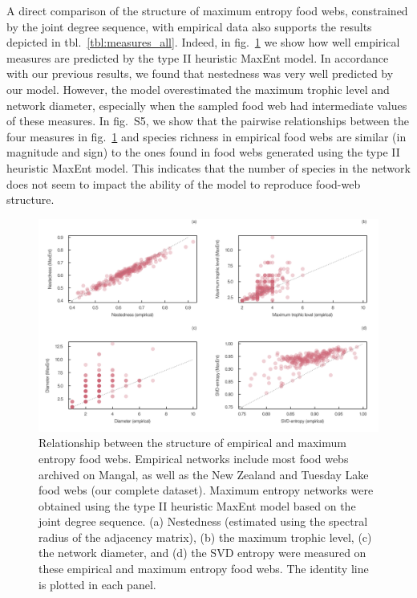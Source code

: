 \documentclass[10pt,oneside]{article}
\makeatletter
\def\maxwidth{\ifdim\Gin@nat@width>\linewidth\linewidth
\else\Gin@nat@width\fi}
\let\Oldincludegraphics\includegraphics
\renewcommand{\includegraphics}[1]{\Oldincludegraphics[width=\maxwidth]{#1}}
\makeatother
\begin{document}
A direct comparison of the structure of maximum entropy food webs,
constrained by the joint degree sequence, with empirical data also
supports the results depicted in tbl.~\ref{tbl:measures_all}. Indeed, in
fig.~\ref{fig:measures} we show how well empirical measures are
predicted by the type II heuristic MaxEnt model. In accordance with our
previous results, we found that nestedness was very well predicted by
our model. However, the model overestimated the maximum trophic level
and network diameter, especially when the sampled food web had
intermediate values of these measures. In fig.~S5, we show that the
pairwise relationships between the four measures in
fig.~\ref{fig:measures} and species richness in empirical food webs are
similar (in magnitude and sign) to the ones found in food webs generated
using the type II heuristic MaxEnt model. This indicates that the number
of species in the network does not seem to impact the ability of the
model to reproduce food-web structure.

\begin{figure}
\hypertarget{fig:measures}{%
\centering
\includegraphics{figures/measures_emp_maxent.png}
\caption{Relationship between the structure of empirical and maximum
entropy food webs. Empirical networks include most food webs archived on
Mangal, as well as the New Zealand and Tuesday Lake food webs (our
complete dataset). Maximum entropy networks were obtained using the type
II heuristic MaxEnt model based on the joint degree sequence. (a)
Nestedness (estimated using the spectral radius of the adjacency
matrix), (b) the maximum trophic level, (c) the network diameter, and
(d) the SVD entropy were measured on these empirical and maximum entropy
food webs. The identity line is plotted in each
panel.}\label{fig:measures}
}
\end{figure}
\end{document}
